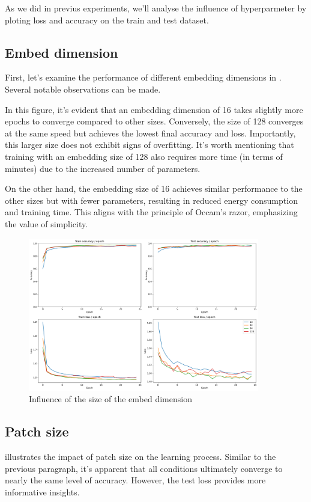 As we did in previus experiments, we'll analyse the influence of hyperparmeter by ploting loss and accuracy on the train and test dataset.

\subsection{Embed dimension}
First, let's examine the performance of different embedding dimensions in . Several notable observations can be made.

In this figure, it's evident that an embedding dimension of 16 takes slightly more epochs to converge compared to other sizes. Conversely, the size of 128 converges at the same speed but achieves the lowest final accuracy and loss. Importantly, this larger size does not exhibit signs of overfitting. It's worth mentioning that training with an embedding size of 128 also requires more time (in terms of minutes) due to the increased number of parameters.

On the other hand, the embedding size of 16 achieves similar performance to the other sizes but with fewer parameters, resulting in reduced energy consumption and training time. This aligns with the principle of Occam's razor, emphasizing the value of simplicity.

\begin{figure}[H]
    \centering
    \includegraphics*[width=0.9\textwidth]{figs/Transformers/embed_dim_influence_25.pdf}
    \caption{Influence of the size of the embed dimension}
    \label{fig:embed_dim_influence}
\end{figure}

\subsection{Patch size}
 illustrates the impact of patch size on the learning process. Similar to the previous paragraph, it's apparent that all conditions ultimately converge to nearly the same level of accuracy. However, the test loss provides more informative insights.

